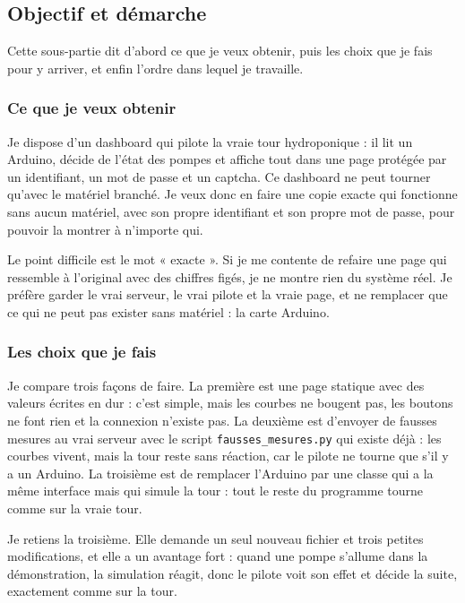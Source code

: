 \subsection{Objectif et démarche}

Cette sous-partie dit d'abord ce que je veux obtenir, puis les choix que je fais pour y arriver, et enfin l'ordre dans lequel je travaille.

\subsubsection*{Ce que je veux obtenir}

Je dispose d'un dashboard qui pilote la vraie tour hydroponique : il lit un Arduino, décide de l'état des pompes et affiche tout dans une page protégée par un identifiant, un mot de passe et un captcha. Ce dashboard ne peut tourner qu'avec le matériel branché. Je veux donc en faire une copie exacte qui fonctionne sans aucun matériel, avec son propre identifiant et son propre mot de passe, pour pouvoir la montrer à n'importe qui.

Le point difficile est le mot « exacte ». Si je me contente de refaire une page qui ressemble à l'original avec des chiffres figés, je ne montre rien du système réel. Je préfère garder le vrai serveur, le vrai pilote et la vraie page, et ne remplacer que ce qui ne peut pas exister sans matériel : la carte Arduino.

\subsubsection*{Les choix que je fais}

Je compare trois façons de faire. La première est une page statique avec des valeurs écrites en dur : c'est simple, mais les courbes ne bougent pas, les boutons ne font rien et la connexion n'existe pas. La deuxième est d'envoyer de fausses mesures au vrai serveur avec le script \texttt{fausses\_mesures.py} qui existe déjà : les courbes vivent, mais la tour reste sans réaction, car le pilote ne tourne que s'il y a un Arduino. La troisième est de remplacer l'Arduino par une classe qui a la même interface mais qui simule la tour : tout le reste du programme tourne comme sur la vraie tour.

Je retiens la troisième. Elle demande un seul nouveau fichier et trois petites modifications, et elle a un avantage fort : quand une pompe s'allume dans la démonstration, la simulation réagit, donc le pilote voit son effet et décide la suite, exactement comme sur la tour.

